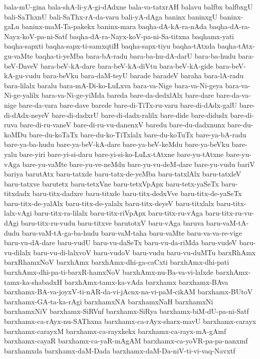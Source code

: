 {bala-mU-gina
bala-shA-li-yA-gi-dAdxne
bala-va-tatxrAH
balavu
balfbx
balfbxgU
bali-SaThxnU
bali-SaThx-rA-da-varu
bali-yA-dAga
baninx
baninxgU
baninx-gaLu
baninx-maM-Ta-pakekx
baninx-mara
baqha-dA-kA-ra-nAda
baqha-dA-ra-Nayx-koV-pa-ni-Satf
baqha-dA-ra-Nayx-koV-pa-ni-Sa-titxna
baqhamx-yati
baqha-sapxti
baqha-sapx-ti-samxqtiH
baqha-sapx-tiyu
baqha-tAtxda
baqha-tAtx-gu-vaMte
baqha-ti-yeMba
bara-bA-radu
bara-ba-hu-dA-darU
bara-ba-hudu
bara-beV-DaveV
bara-beV-kA-dare
bara-beV-kA-diVtu
bara-beV-kA-gide
bara-beV-kA-gu-vudu
bara-beVku
bara-daM-teyU
barade
baradeV
baraha
bara-lA-radu
bara-lilalx
baralu
bara-mA-Di-ko-LuLxva
bara-va-Nige
bara-va-Ni-geya
bara-va-Ni-ge-yalilx
bara-va-Ni-ge-yiMda
bareda
bare-da-dedxlAlx
bare-dare
bare-da-va-nige
bare-da-vara
bare-dave
barede
bare-di-TiTx-ru-varu
bare-di-dAdx-galU
bare-di-dAdx-neyeV
bare-di-dadxrU
bare-di-dadx-ralilx
bare-dide
bare-didudx
bare-di-ruva
bare-di-ru-vaneV
bare-di-ru-vu-danenxV
baredu
bare-du-dadxnunx
bare-du-koMDu
bare-du-koTaTx
bare-du-ko-TiTxlalx
bare-du-koTuTx
bare-ya-bA-radu
bare-ya-ba-hudu
bare-ya-beV-kA-dare
bare-ya-beV-keMdu
bare-ya-beVku
bare-yalu
bare-yiri
bare-yi-si-daru
bare-yi-si-ko-LuLx-tAtxne
bare-yu-tAtxne
bare-yu-vAga
bare-yu-vaMte
bare-yu-ve-neMdu
bare-yu-vu-deM-dare
bare-yu-vudu
bariV
bariya
barutAtx
baru-tatxde
baru-tatx-de-yeMba
baru-tatxlAlx
baru-tatxleV
baru-tatxve
barutetx
baru-tetxVne
baru-tetxVpApx
baru-tetx-yaSeTx
baru-titxdadx
baru-titx-dadxre
baru-titxde
baru-titx-dedxVve
baru-titx-de-yaSeTx
baru-titx-de-yalAlx
baru-titx-de-yalalx
baru-titx-deyeV
baru-titxlalx
baru-titx-lalx-vAgi
baru-titx-ra-lilalx
baru-titx-riVpApx
baru-titx-ru-vAga
baru-titx-ru-vu-dAgi
baru-titx-ru-vudu
baru-titxve
barutotxV
baru-vAga
baruva
baru-vaM-tA-dudu
baru-vaM-tA-ga-ba-hudu
baru-vaM-taha
baru-vaMte
baru-va-va-re-vige
baru-vu-dA-dare
baru-vudU
baru-vu-daSeTx
baru-vu-da-riMda
baru-vudeV
baru-vu-dilalx
baru-vu-di-lalxvoV
baru-vudoV
baru-vudu
baru-vu-duMTu
barxRhAmx
barxRhamxNoV
barxhAmx
barxhAmx-dhi-ga-caCxti
barxhAmx-dhi-pati
barxhAmx-dhi-pa-ti-barxR-hamxNoV
barxhAmx-nu-Ba-va-vi-lalxde
barxhAmx-tamx-ka-shabadxH
barxhAmx-tamx-ka-vAda
barxhamx
barxhamx-BAva
barxhamx-BA-va-joyxV-ti-nAR-da-vi-jAcnx-na-vi-paM-cikAM
barxhamx-BUtoV
barxhamx-GA-ta-ka-rAgi
barxhamxNA
barxhamxNaH
barxhamxNi
barxhamxNiV
barxhamx-SiRVnf
barxhamx-SiRya
barxhamx-biM-dU-pa-ni-Satf
barxhamx-ca-rAyx-nu-SAThxna
barxhamx-ca-rAyx-sharx-mavU
barxhamx-carayx
barxhamx-carayxM
barxhamx-ca-rayxkekx
barxhamx-ca-rayx-mA-gAmf
barxhamx-cayaR
barxhamx-ca-yaR-mAgAM
barxhamx-ca-yoVR-pa-pa-nanxmf
barxhamxda
barxhamx-daM-Dada
barxhamx-daM-Da-niV-ti-vi-vaq-Navxtf
}
